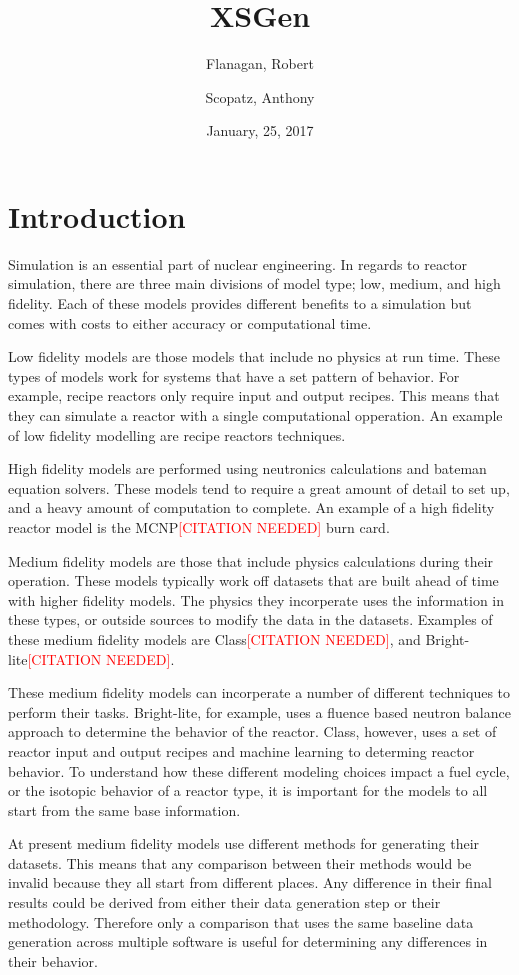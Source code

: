 \documentclass{article}
\newcommand{\citeme}{\textcolor{red}{[CITATION NEEDED]}\xspace}
\begin{document}
\title{XSGen}
\date{January, 25, 2017}
\author{Flanagan, Robert \and Scopatz, Anthony}
\maketitle
\onehalfspacing

\section{Introduction}
Simulation is an essential part of nuclear engineering. In regards to reactor simulation, there are three main divisions of model type; low, medium, and high fidelity. Each of these models provides different benefits to a simulation but comes with costs to either accuracy or computational time.  

Low fidelity models are those models that include no physics at run time. These types of models work for systems that have a set pattern of behavior. For example, recipe reactors only require input and output recipes. This means that they can simulate a reactor with a single computational opperation.  An example of low fidelity modelling are recipe reactors techniques. 

High fidelity models are performed using neutronics calculations and bateman equation solvers. These models tend to require a great amount of detail to set up, and a heavy amount of computation to complete. An example of a high fidelity reactor model is the MCNP\citeme burn card.  

Medium fidelity models are those that include physics calculations during their operation. These models typically work off datasets that are built ahead of time with higher fidelity models. The physics they incorperate uses the information in these types, or outside sources to modify the data in the datasets. Examples of these medium fidelity models are Class\citeme, and Bright-lite\citeme. 

These medium fidelity models can incorperate a number of different techniques to perform their tasks. Bright-lite, for example, uses a fluence based neutron balance approach to determine the behavior of the reactor. Class, however, uses a set of reactor input and output recipes and machine learning to determing reactor behavior. To understand how these different modeling choices impact a fuel cycle, or the isotopic behavior of a reactor type, it is important for the models to all start from the same base information. 

At present medium fidelity models use different methods for generating their datasets. This means that any comparison between their methods would be invalid because they all start from different places. Any difference in their final results could be derived from either their data generation step or their methodology. Therefore only a comparison that uses the same baseline data generation across multiple software is useful for determining any differences in their behavior. 
\end{document}
